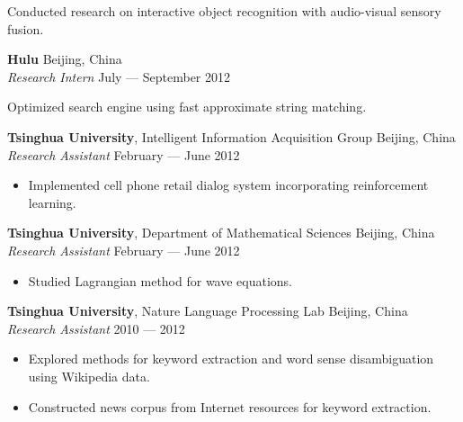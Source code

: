 \documentclass[a4paper,9pt]{extarticle} %
\begin{document}
Conducted research on interactive object recognition with audio-visual sensory fusion.


\textbf{Hulu} \hfill Beijing, China \\
\textit{Research Intern} \hfill July --- September 2012%
\vspace{-.5\parskip}

Optimized search engine using fast approximate string matching.


\iffalse{}

\textbf{Tsinghua University}, Intelligent Information Acquisition Group \hfill Beijing, China \\
\textit{Research Assistant} \hfill February --- June 2012
\vspace{-\parskip}
\begin{itemize}
  \item Implemented cell phone retail dialog system incorporating reinforcement learning.
\end{itemize}


\textbf{Tsinghua University}, Department of Mathematical Sciences \hfill Beijing, China \\
\textit{Research Assistant} \hfill February --- June 2012
\vspace{-\parskip}
\begin{itemize}
  \item Studied Lagrangian method for wave equations.
\end{itemize}


\textbf{Tsinghua University}, Nature Language Processing Lab \hfill Beijing, China \\
\textit{Research Assistant} \hfill 2010 --- 2012
\vspace{-\parskip}
\begin{itemize}
  \item Explored methods for keyword extraction and word sense disambiguation using Wikipedia data.
  \item Constructed news corpus from Internet resources for keyword extraction.
\end{itemize}
\end{document}
